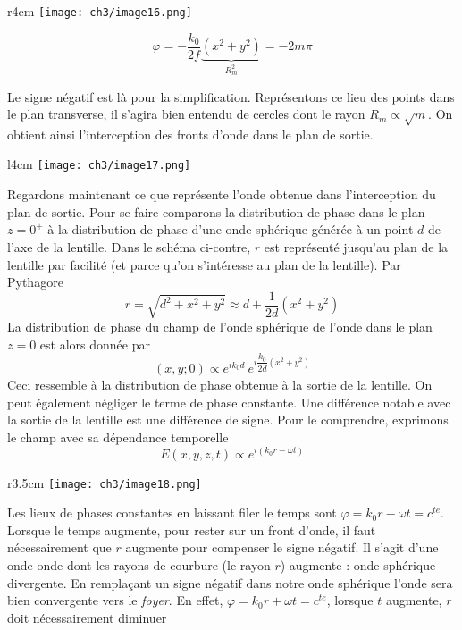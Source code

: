 	\begin{wrapfigure}[12]{r}{4cm}
	\vspace{-5mm}
	\texttt{[image: ch3/image16.png]}
	\end{wrapfigure}	
\begin{equation}
\varphi = -\dfrac{k_0}{2f}\underbrace{(x^2+y^2)}_{R_m^2} = -2m\pi
\end{equation}

Le signe négatif est là pour la simplification. Représentons ce lieu des points dans le plan transverse, 
il s'agira bien entendu de cercles dont le rayon $R_m\propto \sqrt{m}$. On obtient ainsi l'interception
des fronts d'onde dans le plan de sortie.

\newpage
	\begin{wrapfigure}[8]{l}{4cm}
	\texttt{[image: ch3/image17.png]}
	\end{wrapfigure}	
Regardons maintenant ce que représente l'onde obtenue dans l'interception du plan de sortie. Pour se faire 
comparons la distribution de phase dans le plan $z=0^+$ à la distribution de phase d'une onde sphérique 
générée à un point $d$ de l'axe de la lentille. Dans le schéma ci-contre, $r$ est représenté jusqu'au plan 
de la lentille par facilité (et parce qu'on s'intéresse au plan de la lentille). Par Pythagore
\begin{equation}
r = \sqrt{d^2+x^2+y^2} \approx d + \dfrac{1}{2d}\left(x^2+y^2\right)
\end{equation}
La distribution de phase du champ de l'onde sphérique de l'onde dans le plan $z=0$ est alors donnée par
\begin{equation}
(x,y;0) \propto e^{ik_0d}\ e^{i\dfrac{k_0}{2d}(x^2+y^2)}
\end{equation}
Ceci ressemble à la distribution de phase obtenue à la sortie de la lentille. On peut également négliger 
le terme de phase constante. Une différence notable avec la sortie de la lentille est une différence de 
signe. Pour le comprendre, exprimons le champ avec sa dépendance temporelle
\begin{equation}
E(x,y,z,t) \propto e^{i(k_0r-\omega t)}
\end{equation}

	\begin{wrapfigure}[8]{r}{3.5cm}
	\vspace{-5mm}
	\texttt{[image: ch3/image18.png]}
	\end{wrapfigure}
Les lieux de phases constantes en laissant filer le temps sont $\varphi = k_0 r-\omega t = c^{te}$. Lorsque 
le temps augmente, pour rester sur un front d'onde, il faut nécessairement que $r$ augmente pour compenser 
le signe négatif. Il s'agit d'une onde onde dont les rayons de courbure (le rayon $r$) augmente : onde 
sphérique divergente. En remplaçant un signe négatif dans notre onde sphérique l'onde sera bien convergente 
vers le \textit{foyer}. En effet, $\varphi = k_0 r+\omega t = c^{te}$, 
lorsque $t$ augmente, $r$ doit nécessairement diminuer \\

